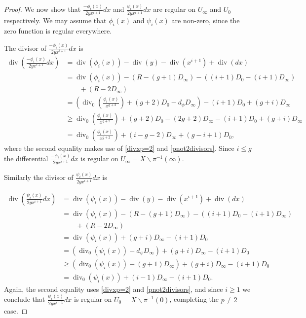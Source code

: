 \documentclass[11pt]{article} %
\theoremstyle{plain}
\theoremstyle{remark}
\DeclareMathOperator{\di}{div}
\begin{document}
\begin{proof}
We now show that $\frac{-\phi_i(x)}{2yx^{i+1}}dx$ and $\frac{\psi_i(x)}{2yx^{i+1}}dx$ are regular on $U_\infty$ and $U_0$ respectively.
We may assume that $\phi_i(x)$ and $\psi_i(x)$ are non-zero, since the zero function is regular everywhere.


The divisor of $\frac{-\phi_i(x)}{2yx^{i+1}}dx$ is
\begin{align*}
\di\left( \frac{-\phi_i(x)}{2yx^{i+1}}dx \right) & =  \di(\phi_i(x)) -\di(y) - \di(x^{i+1}) + \di (dx) \\
& =  \di(\phi_i(x)) - ( R - (g+1)D_\infty) - ((i+1)D_0 - (i+1)D_\infty) \\
& \qquad + (R - 2D_\infty) \\
& =  \left( \di_0\left( \frac{\phi_i(x)}{x^{g+2}}\right) + (g+2)D_0 - d_\phi D_\infty\right) - (i+1)D_0 + (g+i)D_\infty \\
& \geq  \di_0\left( \frac{\phi_i(x)}{x^{g+2}}\right) + (g+2)D_0 - (2g+2)D_\infty - (i+1)D_0 + (g+i)D_\infty \\
& =  \di_0\left( \frac{\phi_i(x)}{x^{g+2}} \right) + (i-g-2)D_\infty + (g-i+1)D_0,
\end{align*}
where the second equality makes use of \eqref{divxp=2} and \eqref{pnot2divisors}.
Since $i \leq g$ the differential $\frac{-\phi_i(x)}{2yx^{i+1}}dx$ is regular on $U_\infty = X\backslash \pi^{-1}(\infty)$.

Similarly the divisor of $\frac{\psi_i(x)}{2yx^{i+1}}dx$ is

\begin{align*}
\di \left( \frac{\psi_i(x)}{2yx^{i+1}}dx\right) & =  \di(\psi_i(x)) - \di(y) - \di(x^{i+1}) + \di (dx) \\
& =  \di (\psi_i(x) ) -(R - (g+1)D_\infty) - ((i+1)D_0 - (i+1)D_\infty) \\ 
& \qquad + (R -2D_\infty) \\
& =  \di(\psi_i(x)) + (g+i)D_\infty -(i+1)D_0 \\
& =  (\di_0(\psi_i(x)) -d_\psi D_\infty) + (g+i)D_\infty -(i+1)D_0 \\
& \geq \left( \di_0(\psi_i(x)) - (g+1)D_\infty \right) + (g+i)D_\infty -(i+1)D_0 \\
& =  \di_0(\psi_i(x)) + (i-1)D_\infty - (i+1)D_0.
\end{align*}
Again, the second equality uses \eqref{divxp=2} and \eqref{pnot2divisors}, and since $i\geq 1$ we conclude that $\frac{\psi_i(x)}{2yx^{i+1}}dx$ is regular on $U_0 = X \backslash \pi^{-1}(0)$, completing the $p\neq 2$ case.



\end{proof}
\end{document}
